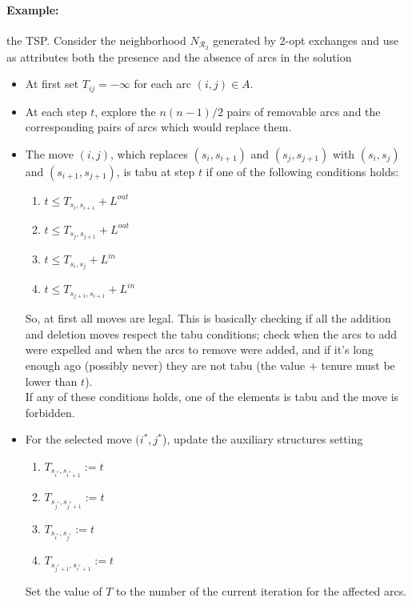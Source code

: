 \documentclass[11pt]{article}
\begin{document}
	\paragraph{Example:} the TSP. Consider the neighborhood $N_{\mathcal{R}_2}$ generated by 2-opt exchanges and use as attributes both the presence and the absence of arcs in the solution
	\begin{itemize}
		\item At first set $T_{ij} = -\infty$ for each arc $(i, j) \in A$.\\
		
		\item At each step $t$, explore the $n(n − 1)/2$ pairs of removable arcs and the corresponding pairs of arcs which would replace them.\\
		
		\item The move $(i, j)$, which replaces $(s_i , s_{i+1})$ and $(s_j , s_{j+1})$ with $(s_i , s_j )$ and $(s_{i+1}, s_{j+1})$, is tabu at step $t$ if one of the following conditions holds:
		\begin{enumerate}
			\item $t \leq T_{s_i ,s_{i+1}} + L^{out}$
			\item $t \leq T_{s_j ,s_{j+1}} + L^{out}$
			\item $t \leq T_{s_i ,s_j} + L^{in}$
			\item $t \leq T_{s_{j+1},s_{i+1}} + L^{in}$
		\end{enumerate}
		So, at first all moves are legal. This is basically checking if all the addition and deletion moves respect the tabu conditions; check when the arcs to add were expelled and when the arcs to remove were added, and if it's long enough ago (possibly never) they are not tabu (the value $+$ tenure must be lower than $t$).\\
		If any of these conditions holds, one of the elements is tabu and the move is forbidden.\\
		
		\item For the selected move $(i^\ast, j^\ast$), update the auxiliary structures setting
		\begin{enumerate}
			\item $T_{s_{i^\ast} ,s_{i^\ast + 1}} := t$
			\item $T_{s_{j^\ast} ,s_{j^\ast + 1}} := t$
			\item $T_{s_{i^\ast} ,s_{j^\ast}} := t$
			\item $T_{s_{j^\ast + 1},s_{i^\ast + 1}} := t$
		\end{enumerate}
		Set the value of $T$ to the number of the current iteration for the affected arcs.\\
	\end{itemize}
	
\end{document}
